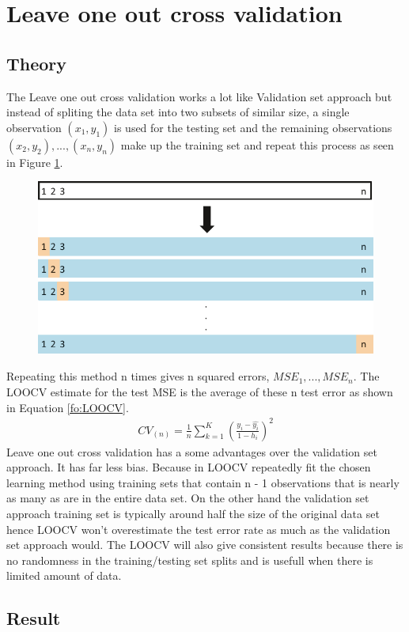 \section {Leave one out cross validation}
\subsection{Theory}
The Leave one out cross validation works a lot like Validation set approach but instead of spliting the data set into two subsets of
similar size, a single observation $(x_1, y_1)$ is used for the testing set and the remaining observations ${(x_2, y_2), . . . , (x_n, y_n)}$ make up the training set and repeat this process as seen in Figure \ref{fig:loocv}.
\begin{figure}[H]
	\centering
	\includegraphics[width=0.5\linewidth]{crossValidation/LOOCV}
	\caption{}
	\label{fig:loocv}
\end{figure}
Repeating this method n times gives n squared errors, $MSE_1, . . . , MSE_n$. The LOOCV estimate for the test MSE is the average of these n test error as shown in Equation \ref{fo:LOOCV}.
\begin{align}\label{fo:LOOCV}
CV_{(n)} = \frac {1}{n} \sum_{k=1}^{K}  (\frac {y_i-\hat{y_i}}{1- h_i})^2
\end{align}
Leave one out cross validation has a some advantages over the validation set approach. It has far less bias. Because in LOOCV repeatedly fit the chosen learning method using training sets that contain n - 1 observations that is nearly as many as are in the entire data set. On the other hand the validation set approach training set is typically around half the size of the original data set hence LOOCV won't overestimate the test error rate as much as the validation set approach would. The LOOCV will also give consistent results because there is no randomness in the training/testing set splits and is usefull when there is limited amount of data.

\subsection{Result}
